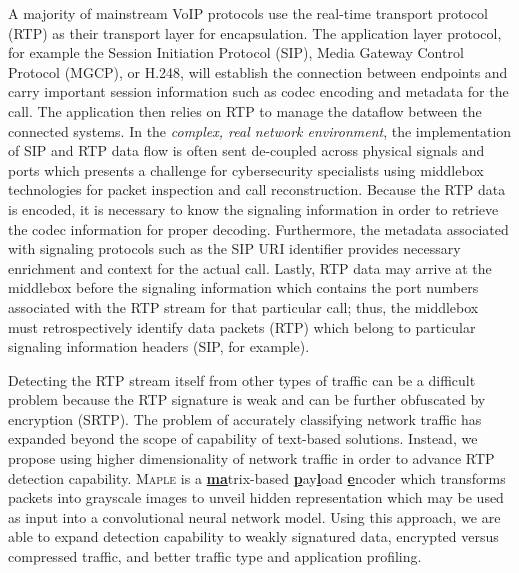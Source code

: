 A majority of mainstream VoIP protocols use the real-time transport protocol (RTP) as their transport layer for encapsulation. The application layer protocol, for example the Session Initiation Protocol (SIP), Media Gateway Control Protocol (MGCP), or H.248, will establish the connection between endpoints and carry important session information such as codec encoding and metadata for the call. The application then relies on RTP to manage the dataflow between the connected systems. In the \textit{complex, real network environment}, the implementation of SIP and RTP data flow is often sent de-coupled across physical signals and ports which presents a challenge for cybersecurity specialists using middlebox technologies for packet inspection and call reconstruction. Because the RTP data is encoded, it is necessary to know the signaling information in order to retrieve the codec information for proper decoding. Furthermore, the metadata associated with signaling protocols such as the SIP URI identifier provides necessary enrichment and context for the actual call. Lastly, RTP data may arrive at the middlebox before the signaling information which contains the port numbers associated with the RTP stream for that particular call; thus, the middlebox must retrospectively identify data packets (RTP) which belong to particular signaling information headers (SIP, for example).

Detecting the RTP stream itself from other types of traffic can be a difficult problem because the RTP signature is weak and can be further obfuscated by encryption (SRTP). The problem of accurately classifying network traffic has expanded beyond the scope of capability of text-based solutions. Instead, we propose using higher dimensionality of network traffic in order to advance RTP detection capability. \textsc{Maple} is a \underline{\textbf{ma}}trix-based \underline{\textbf{p}}ay\underline{\textbf{l}}oad \underline{\textbf{e}}ncoder which transforms packets into grayscale images to unveil hidden representation which may be used as input into a convolutional neural network model. Using this approach, we are able to expand detection capability to weakly signatured data, encrypted versus compressed traffic, and better traffic type and application profiling.
